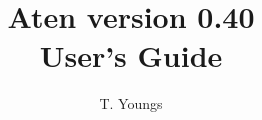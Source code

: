 \documentclass[a4paper,10pt]{report}
\begin{document}
\newenvironment{optlist}[1]
  {
    \begin{flushleft}\textbf{#1}\end{flushleft}
    \begin{list}{}{}
  }
  { \end{list} }

\newcommand{\progname}{{\sffamily Aten}}
\newcommand{\qte}[1]{\lq{}#1\rq{}}
\newcommand{\ttqte}[1]{\lq{}{\ttfamily#1}\rq{}}
\newcommand{\dqte}[1]{``#1''}
\newcommand{\its}{\hspace{20cm}}

\title{\progname{} version 0.40 \\ User's Guide}
\author{T. Youngs}
\maketitle

\tableofcontents












\printindex
\end{document}
